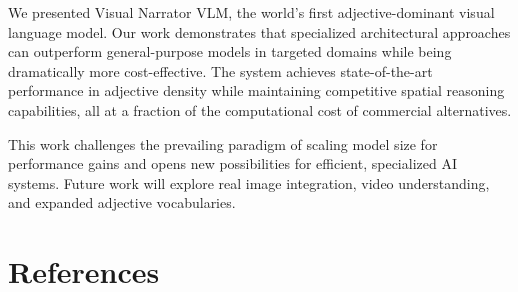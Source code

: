 \documentclass[10pt]{article}
\begin{document}
We presented Visual Narrator VLM, the world's first adjective-dominant visual language model. Our work demonstrates that specialized architectural approaches can outperform general-purpose models in targeted domains while being dramatically more cost-effective. The system achieves state-of-the-art performance in adjective density while maintaining competitive spatial reasoning capabilities, all at a fraction of the computational cost of commercial alternatives.

This work challenges the prevailing paradigm of scaling model size for performance gains and opens new possibilities for efficient, specialized AI systems. Future work will explore real image integration, video understanding, and expanded adjective vocabularies.

\section*{References}



\end{document}
